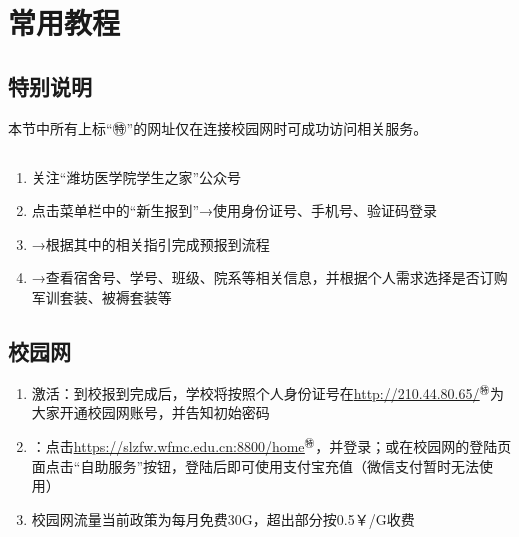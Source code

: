 \chapter[常用教程]{常用教程}

\section*{特别说明}
本节中所有上标“㊕”的网址仅在连接校园网时可成功访问相关服务。

\section[新生信息查询]{}
\label{freshman_query}
\begin{enumerate}
    \item 关注“潍坊医学院学生之家”公众号
    \item 点击菜单栏中的“新生报到”→使用身份证号、手机号、验证码登录
    \item →根据其中的相关指引完成预报到流程
    \item →查看宿舍号、学号、班级、院系等相关信息，并根据个人需求选择是否订购军训套装、被褥套装等\footnotemark
\end{enumerate}

\section[校园网]{校园网}
\begin{enumerate}
    \item 激活：到校报到完成后，学校将按照个人身份证号在\uline{\href{http://210.44.80.65/}{http://210.44.80.65/}$^㊕$}为大家开通校园网账号，并告知初始密码\footnotemark
    \item \textbf{}：点击\uline{\href{https://slzfw.wfmc.edu.cn:8800/home/}{https://slzfw.wfmc.edu.cn:8800/home}$^㊕$}，并登录；或在校园网的登陆页面点击“自助服务”按钮\footnotemark，登陆后即可使用支付宝充值（微信支付暂时无法使用）
    \item 校园网流量当前政策为每月免费30G，超出部分按0.5\textsf{￥}/G收费
\end{enumerate}

